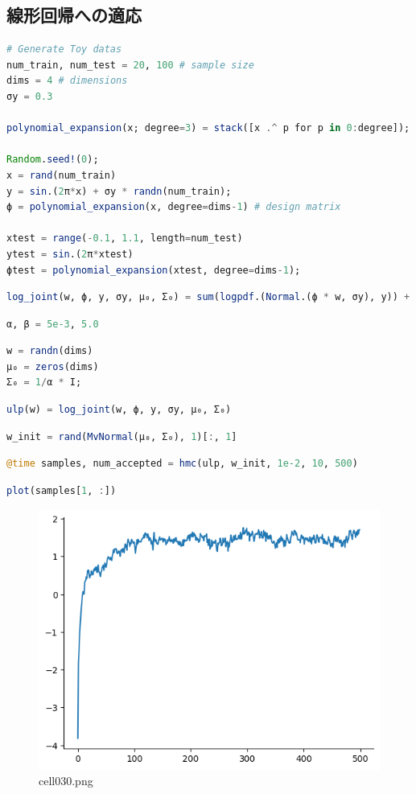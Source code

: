 \subsection{線形回帰への適応}
\begin{lstlisting}[language=julia]
# Generate Toy datas
num_train, num_test = 20, 100 # sample size
dims = 4 # dimensions
σy = 0.3

polynomial_expansion(x; degree=3) = stack([x .^ p for p in 0:degree]);

Random.seed!(0);
x = rand(num_train)
y = sin.(2π*x) + σy * randn(num_train);
ϕ = polynomial_expansion(x, degree=dims-1) # design matrix

xtest = range(-0.1, 1.1, length=num_test)
ytest = sin.(2π*xtest)
ϕtest = polynomial_expansion(xtest, degree=dims-1);
\end{lstlisting}
\begin{lstlisting}[language=julia]
log_joint(w, ϕ, y, σy, μ₀, Σ₀) = sum(logpdf.(Normal.(ϕ * w, σy), y)) + logpdf(MvNormal(μ₀, Σ₀), w);
\end{lstlisting}
\begin{lstlisting}[language=julia]
α, β = 5e-3, 5.0
\end{lstlisting}
\begin{lstlisting}[language=julia]
w = randn(dims)
μ₀ = zeros(dims)
Σ₀ = 1/α * I;
\end{lstlisting}
\begin{lstlisting}[language=julia]
ulp(w) = log_joint(w, ϕ, y, σy, μ₀, Σ₀)
\end{lstlisting}
\begin{lstlisting}[language=julia]
w_init = rand(MvNormal(μ₀, Σ₀), 1)[:, 1]
\end{lstlisting}
\begin{lstlisting}[language=julia]
@time samples, num_accepted = hmc(ulp, w_init, 1e-2, 10, 500)
\end{lstlisting}
\begin{lstlisting}[language=julia]
plot(samples[1, :])
\end{lstlisting}
\begin{figure}[ht]
	\centering
	\includegraphics[scale=0.8, max width=\linewidth]{./fig/bayesian-brain/mcmc/cell030.png}
	\caption{cell030.png}
	\label{cell030.png}
\end{figure}

